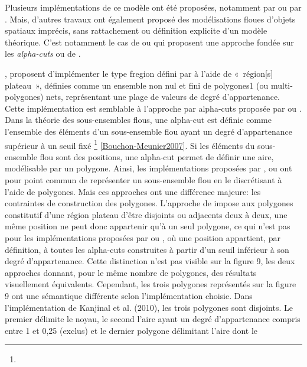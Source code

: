 Plusieurs implémentations de ce modèle ont été proposées, notamment
par \textcite{Kanjilal2010} ou par \textcite{Dilo2006,Dilo2007}. Mais,
d’autres travaux ont également proposé des modélisations floues
d’objets spatiaux imprécis, sans rattachement ou définition explicite
d’un modèle théorique. C’est notamment le cas de  ou
 qui proposent une approche fondée sur les
\emph{alpha-cuts} \autocite{de Runz2008,de
  Runz2008,Zoghlami2013,Zoghlami2016} ou de \textcite{Carniel2016}.

\textcite{Kanjina2100}, proposent d’implémenter le type fregion défini
par \textcite{Schneider1999} à l’aide de « région[s] plateau »,
définies comme un ensemble non nul et fini de polygones1 (ou
multi-polygones) nets, représentant une plage de valeurs de degré
d’appartenance. Cette implémentation est semblable à l’approche par
alpha-cuts proposée par \textcite{de Runz2008} ou
\textcite{Zoghalmi2013,Zoghalmi2016}. Dans la théorie des
sous-ensembles flous, une alpha-cut est définie comme l’ensemble des
éléments d’un sous-ensemble flou ayant un degré d’appartenance
supérieur à un seuil fixé \footnote{}
\autoref{Bouchon-Meunier2007}. Si les éléments du sous-ensemble flou
sont des positions, une alpha-cut permet de définir une aire,
modélisable par un polygone. Ainsi, les implémentations proposées par
\textcite{Kanjinal2010}, \textcite{Zoghalmi2013,Zoghalmi2016} ou
\textcite{de Runz2008} ont pour point commun de représenter un
sous-ensemble flou en le discrétisant à l’aide de polygones. Mais ces
approches ont une différence majeure: les contraintes de construction
des polygones. L’approche de \textcite{Kanjinal2010} impose aux
polygones constitutif d’une région plateau d’être disjoints ou
adjacents deux à deux, une même position ne peut donc appartenir qu’à
un seul polygone, ce qui n’est pas pour les implémentations proposées
par \textcite{Zoghalmi2013,Zoghalmi2016} ou \textcite{de Runz2008}, où
une position appartient, par définition, à toutes les alpha-cuts
construites à partir d’un seuil inférieur à son degré
d’appartenance. Cette distinction n’est pas visible sur la figure 9,
les deux approches donnant, pour le même nombre de polygones, des
résultats visuellement équivalents. Cependant, les trois polygones
représentés sur la figure 9 ont une sémantique différente selon
l’implémentation choisie. Dans l’implémentation de Kanjinal et
al. (2010), les trois polygones sont disjoints. Le premier délimite le
noyau, le second l’aire ayant un degré d’appartenance compris entre 1
et 0,25 (exclus) et le dernier polygone délimitant l’aire dont le
